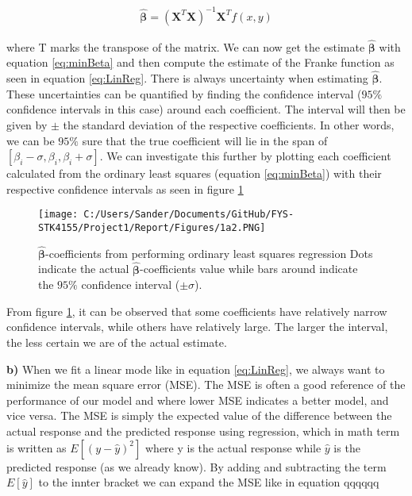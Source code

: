 \documentclass[12pt,a4paper]{article}
\begin{document}
\begin{equation}\label{eq:minBeta}
\begin{aligned}
\hat{\boldsymbol{\beta}} = (\textbf{X}^T\textbf{X})^{-1}\textbf{X}^T f(x,y)
\end{aligned}
\end{equation}

\noindent where T marks the transpose of the matrix. We can now get the estimate $\hat{\boldsymbol{\beta}}$ with equation \ref{eq:minBeta} and then compute the estimate of the Franke function as seen in equation \ref{eq:LinReg}. There is always uncertainty when estimating $\hat{\boldsymbol{\beta}}$. These uncertainties can be quantified by finding the confidence interval ($95\%$ confidence intervals in this case) around each coefficient. The interval will then be given by $\pm$ the standard deviation of the respective coefficients. In other words, we can be $95\%$ sure that the true coefficient will lie in the span of $[\beta_i - \sigma,\beta_i, \beta_i + \sigma]$. We can investigate this further by plotting each coefficient calculated from the ordinary least squares (equation \ref{eq:minBeta}) with their respective confidence intervals as seen in figure \ref{fig:polydegree}

\begin{figure}[H]
\centering
\texttt{[image: C:/Users/Sander/Documents/GitHub/FYS-STK4155/Project1/Report/Figures/1a2.PNG]}
\caption{\label{fig:polydegree} $\hat{\boldsymbol{\beta}}$-coefficients from performing ordinary least squares regression Dots indicate the actual $\hat{\boldsymbol{\beta}}$-coefficients value while bars around indicate the $95\%$ confidence interval ($\pm \sigma$).}
\end{figure}

From figure \ref{fig:polydegree}, it can be observed that some coefficients have relatively narrow confidence intervals, while others have relatively large. The larger the interval, the less certain we are of the actual estimate. 

\newpage

\noindent \textbf{b)} When we fit a linear mode like in equation \ref{eq:LinReg}, we always want to minimize the mean square error (MSE). The MSE is often a good reference of the performance of our model and where lower MSE indicates a better model, and vice versa. The MSE is simply the expected value of the difference between the actual response and the predicted response using regression, which in math term is written as $E[(y-\hat{y})^2]$ where y is the actual response while $\hat{y}$ is the predicted response (as we already know). By adding and subtracting the term $E[\hat{y}]$ to the innter bracket we can expand the MSE like in equation qqqqqq
\end{document}
